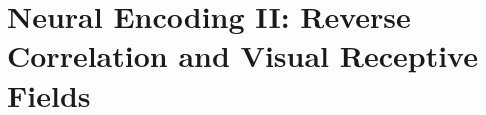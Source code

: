 \chapter{ Neural Encoding II: Reverse Correlation and Visual Receptive Fields}
\label{cha:Neural Encoding II}

\begin{multicols}{2}
\setlength{\columnseprule}{0.2pt}  









\end{multicols}

